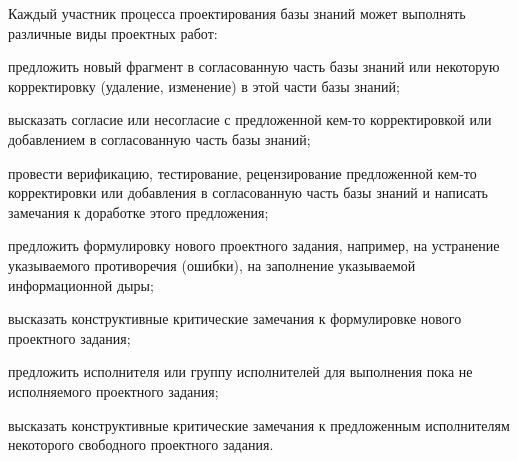 \begin{SCn}
{Каждый участник процесса проектирования базы знаний может выполнять различные виды проектных работ:
\begin{scnitemize}
    \item предложить новый фрагмент в согласованную часть базы знаний или некоторую корректировку (удаление, изменение) в этой части базы знаний;
    \item высказать согласие или несогласие с предложенной кем-то корректировкой или добавлением в согласованную часть базы знаний;
    \item провести верификацию, тестирование, рецензирование предложенной кем-то корректировки или добавления в согласованную часть базы знаний и написать замечания к доработке этого предложения;
    \item предложить формулировку нового проектного задания, например, на устранение указываемого противоречия (ошибки), на заполнение указываемой информационной дыры;
    \item высказать конструктивные критические замечания к формулировке нового проектного задания;
    \item  предложить исполнителя или группу исполнителей для выполнения пока не исполняемого проектного задания;
    \item высказать конструктивные критические замечания к предложенным исполнителям некоторого свободного проектного задания.
\end{scnitemize}

}

\scnendstruct

\end{SCn}